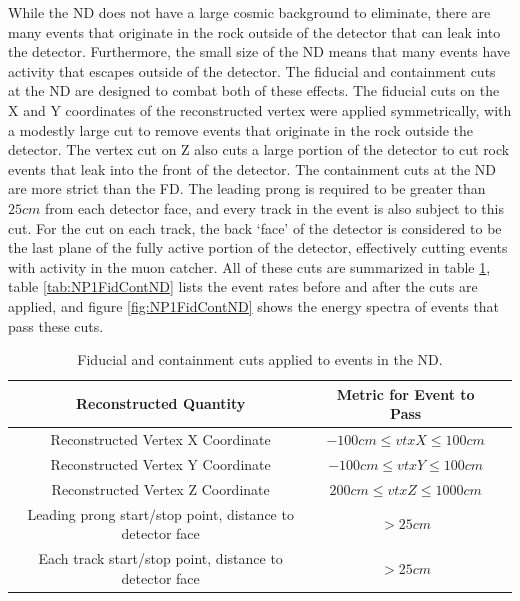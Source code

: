While the ND does not have a large cosmic background to eliminate, there are many events that originate in the rock outside of the detector that can leak into the detector. Furthermore, the small size of the ND means that many events have activity that escapes outside of the detector. The fiducial and containment cuts at the ND are designed to combat both of these effects. The fiducial cuts on the X and Y coordinates of the reconstructed vertex were applied symmetrically, with a modestly large cut to remove events that originate in the rock outside the detector. The vertex cut on Z also cuts a large portion of the detector to cut rock events that leak into the front of the detector. The containment cuts at the ND are more strict than the FD. The leading prong is required to be greater than $25\unit{cm}$ from each detector face, and every track in the event is also subject to this cut. For the cut on each track, the back `face' of the detector is considered to be the last plane of the fully active portion of the detector, effectively cutting events with activity in the muon catcher. All of these cuts are summarized in table \ref{tab:FidContND}, table \ref{tab:NP1FidContND} lists the event rates before and after the cuts are applied, and figure \ref{fig:NP1FidContND} shows the energy spectra of events that pass these cuts.
\begin{table}[htb]
  \begin{center}
    \begin{tabular}{c c c}
      \hline\hline
      Reconstructed Quantity & Metric for Event to Pass \\
      \hline
      Reconstructed Vertex X Coordinate & $-100\unit{cm} \leq vtxX \leq 100\unit{cm} $ \\
      Reconstructed Vertex Y Coordinate & $-100\unit{cm} \leq vtxY \leq 100\unit{cm}$ \\
      Reconstructed Vertex Z Coordinate & $200\unit{cm} \leq vtxZ \leq 1000\unit{cm}$ \\
      Leading prong start/stop point, distance to detector face & $> 25\unit{cm}$ \\
      Each track start/stop point, distance to detector face & $> 25\unit{cm}$ \\
      \hline
    \end{tabular}
    \caption[ND Fiducial and Containment Cuts]{Fiducial and containment cuts applied to events in the ND.}
    \label{tab:FidContND}
  \end{center}
\end{table}

